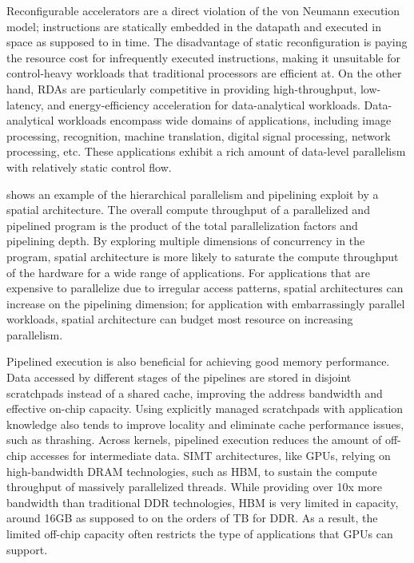 Reconfigurable accelerators are a direct violation of the von Neumann execution model; 
instructions are statically embedded in the datapath and executed in space as supposed to in time.
The disadvantage of static reconfiguration is paying the resource cost for infrequently
executed instructions, making it unsuitable for control-heavy workloads that traditional
processors are efficient at.
On the other hand, RDAs are particularly competitive in providing high-throughput, 
low-latency, and energy-efficiency acceleration for data-analytical workloads.
Data-analytical workloads encompass wide domains of applications, including image processing,
recognition, machine translation, digital signal processing, network processing, etc.
These applications exhibit a rich amount of data-level parallelism with relatively static control
flow.

 shows an example of the hierarchical parallelism and pipelining exploit by
a spatial architecture.
The overall compute throughput of a parallelized and pipelined program is 
the product of the total parallelization factors and pipelining depth.
By exploring multiple dimensions of concurrency in the program, spatial architecture is more likely
to saturate the compute throughput of the hardware for a wide range of applications.
For applications that are expensive to parallelize due to irregular access patterns, spatial
architectures can increase on the pipelining dimension;
for application with embarrassingly parallel workloads, spatial architecture can budget most
resource on increasing parallelism.

Pipelined execution is also beneficial for achieving good memory performance.
Data accessed by different stages of the pipelines are stored in disjoint scratchpads instead of a
shared cache, improving the address bandwidth and effective on-chip capacity.
Using explicitly managed scratchpads with application knowledge also tends to improve locality
and eliminate cache performance issues, such as thrashing.
Across kernels, pipelined execution reduces the amount of off-chip accesses for intermediate
data.
SIMT architectures, like GPUs, relying on high-bandwidth DRAM technologies, such as HBM, to sustain
the compute throughput of massively parallelized threads.
While providing over 10x more bandwidth than traditional DDR technologies, HBM is very limited in
capacity, around 16GB as supposed to on the orders of TB for DDR.
As a result, the limited off-chip capacity often restricts the type of applications that
GPUs can support.


